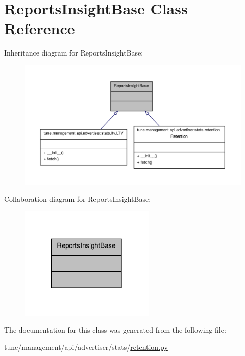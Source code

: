 \hypertarget{classReportsInsightBase}{\section{Reports\-Insight\-Base Class Reference}
\label{classReportsInsightBase}
}


Inheritance diagram for Reports\-Insight\-Base\-:
\nopagebreak
\begin{figure}[H]
\begin{center}
\leavevmode
\includegraphics[width=350pt]{classReportsInsightBase__inherit__graph}
\end{center}
\end{figure}


Collaboration diagram for Reports\-Insight\-Base\-:
\nopagebreak
\begin{figure}[H]
\begin{center}
\leavevmode
\includegraphics[width=182pt]{classReportsInsightBase__coll__graph}
\end{center}
\end{figure}


The documentation for this class was generated from the following file\-:\begin{DoxyCompactItemize}
\item 
tune/management/api/advertiser/stats/\hyperlink{retention_8py}{retention.\-py}\end{DoxyCompactItemize}
